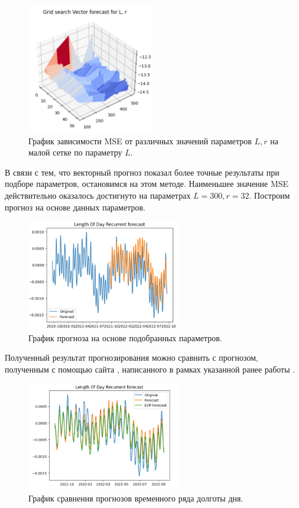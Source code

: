 \documentclass[specialist,
			   substylefile = spbu_report.rtx,
			   subf,href,colorlinks=true, 12pt]{disser}
\begin{document}
\begin{figure}[H]
	\centering
	\includegraphics[width=0.5\textwidth]{py_lod_for_cv_2}
	\caption{График зависимости MSE от различных значений параметров $L, r$ на малой сетке по параметру $L$.}
	\label{fig:py_lod_for_cv_2}
\end{figure}

В связи с тем, что векторный прогноз показал более точные результаты при подборе параметров, остановимся на этом методе. Наименьшее значение MSE действительно оказалось достигнуто на параметрах $L = 300, r = 32$. Построим прогноз на основе данных параметров.

\begin{figure}[H]
	\centering
	\includegraphics[width=0.6\textwidth]{py_lod_rec_min_res.png}
	\caption{График прогноза на основе подобранных параметров.}
	\label{fig:py_lod_rec_min_res}
\end{figure}

Полученный результат прогнозирования можно сравнить с прогнозом, полученным с помощью сайта \cite{eop-pred}, написанного в рамках указанной ранее работы \cite{eop-analysis}.

\begin{figure}[H]
	\centering
	\includegraphics[width=0.6\textwidth]{py_lod_eop}
	\caption{График сравнения прогнозов временного ряда долготы дня.}
	\label{fig:py_lod_eop}
\end{figure}
\end{document}
